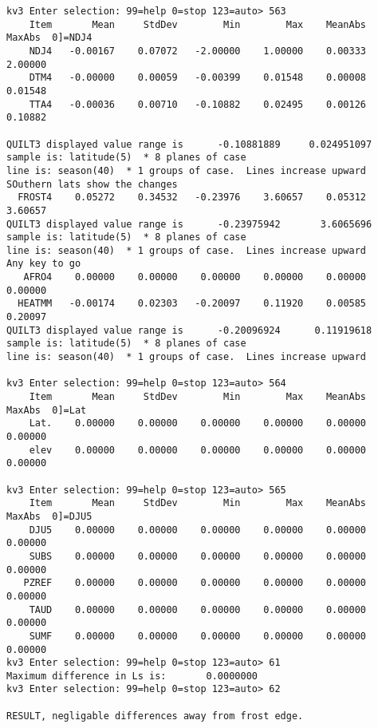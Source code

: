 \documentclass{article}
\begin{document}
\begin{verbatim}
kv3 Enter selection: 99=help 0=stop 123=auto> 563
    Item       Mean     StdDev        Min        Max    MeanAbs     MaxAbs  0]=NDJ4
    NDJ4   -0.00167    0.07072   -2.00000    1.00000    0.00333    2.00000
    DTM4   -0.00000    0.00059   -0.00399    0.01548    0.00008    0.01548
    TTA4   -0.00036    0.00710   -0.10882    0.02495    0.00126    0.10882

QUILT3 displayed value range is      -0.10881889     0.024951097
sample is: latitude(5)  * 8 planes of case
line is: season(40)  * 1 groups of case.  Lines increase upward
SOuthern lats show the changes
  FROST4    0.05272    0.34532   -0.23976    3.60657    0.05312    3.60657
QUILT3 displayed value range is      -0.23975942       3.6065696
sample is: latitude(5)  * 8 planes of case
line is: season(40)  * 1 groups of case.  Lines increase upward
Any key to go
   AFRO4    0.00000    0.00000    0.00000    0.00000    0.00000    0.00000
  HEATMM   -0.00174    0.02303   -0.20097    0.11920    0.00585    0.20097
QUILT3 displayed value range is      -0.20096924      0.11919618
sample is: latitude(5)  * 8 planes of case
line is: season(40)  * 1 groups of case.  Lines increase upward

kv3 Enter selection: 99=help 0=stop 123=auto> 564
    Item       Mean     StdDev        Min        Max    MeanAbs     MaxAbs  0]=Lat
    Lat.    0.00000    0.00000    0.00000    0.00000    0.00000    0.00000
    elev    0.00000    0.00000    0.00000    0.00000    0.00000    0.00000

kv3 Enter selection: 99=help 0=stop 123=auto> 565
    Item       Mean     StdDev        Min        Max    MeanAbs     MaxAbs  0]=DJU5
    DJU5    0.00000    0.00000    0.00000    0.00000    0.00000    0.00000
    SUBS    0.00000    0.00000    0.00000    0.00000    0.00000    0.00000
   PZREF    0.00000    0.00000    0.00000    0.00000    0.00000    0.00000
    TAUD    0.00000    0.00000    0.00000    0.00000    0.00000    0.00000
    SUMF    0.00000    0.00000    0.00000    0.00000    0.00000    0.00000
kv3 Enter selection: 99=help 0=stop 123=auto> 61
Maximum difference in Ls is:       0.0000000
kv3 Enter selection: 99=help 0=stop 123=auto> 62

RESULT, negligable differences away from frost edge.

\end{verbatim}   
\end{document}
